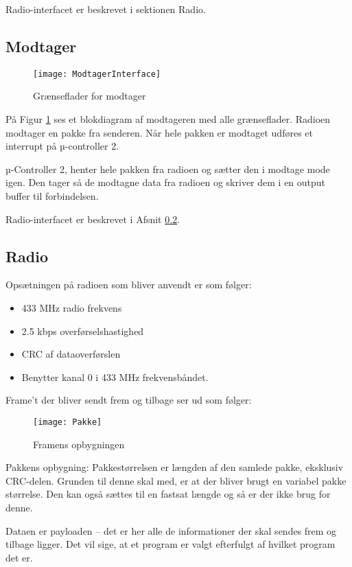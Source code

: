 \documentclass[Main]{subfiles}
\begin{document}
Radio-interfacet er beskrevet i sektionen Radio.



\subsection{Modtager}

\begin{figure}[H]
\centering
\texttt{[image: ModtagerInterface]}
\caption{Grænseflader for modtager}
\label{fig: ModtagerInterface}
\end{figure}
På Figur \ref{fig: ModtagerInterface} ses et blokdiagram af modtageren med alle grænseflader.
Radioen modtager en pakke fra senderen. Når hele pakken er modtaget udføres et interrupt på µ-controller 2.

µ-Controller 2, henter hele pakken fra radioen og sætter den i modtage mode igen. 
Den tager så de modtagne data fra radioen og skriver dem i en output buffer til \itoc forbindelsen.

Radio-interfacet er beskrevet i Afsnit \ref{Sec:Radio}.


\subsection{Radio} \label{Sec:Radio}
Opsætningen på radioen som bliver anvendt er som følger:
\begin{itemize}
\item 433 MHz radio frekvens
\item 2.5 kbps overførselshastighed
\item CRC af dataoverførslen
\item Benytter kanal 0 i 433 MHz frekvensbåndet.
\end{itemize}


Frame't der bliver sendt frem og tilbage ser ud som følger:
\begin{figure}[H]
\centering
\texttt{[image: Pakke]}
\caption{Framens opbygningen}
\label{fig: Pakke}
\end{figure}

Pakkens opbygning:
Pakkestørrelsen er længden af den samlede pakke, eksklusiv CRC-delen. 
Grunden til denne skal med, er at der bliver brugt en variabel pakke størrelse. 
Den kan også sættes til en fastsat længde og så er der ikke brug for denne.

Dataen er payloaden -- det er her alle de informationer der skal sendes frem og tilbage ligger. 
Det vil sige, at et program er valgt efterfulgt af hvilket program det er.
\end{document}
